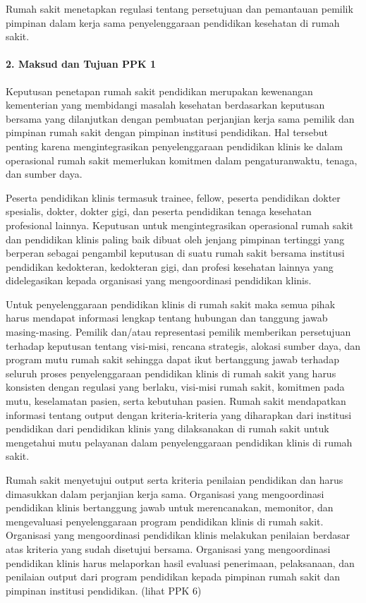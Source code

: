 \documentclass[
]{book}
\begin{document}
Rumah sakit menetapkan regulasi tentang persetujuan dan pemantauan pemilik pimpinan dalam kerja sama penyelenggaraan pendidikan kesehatan di rumah sakit.

\hypertarget{maksud-dan-tujuan-ppk-1}{%
\paragraph*{2. Maksud dan Tujuan PPK 1}\label{maksud-dan-tujuan-ppk-1}}

Keputusan penetapan rumah sakit pendidikan merupakan kewenangan kementerian yang membidangi masalah kesehatan berdasarkan keputusan bersama yang dilanjutkan dengan pembuatan perjanjian kerja sama pemilik dan pimpinan rumah sakit dengan pimpinan institusi pendidikan. Hal tersebut penting karena mengintegrasikan penyelenggaraan pendidikan klinis ke dalam operasional rumah sakit memerlukan komitmen dalam pengaturanwaktu, tenaga, dan sumber daya.

Peserta pendidikan klinis termasuk trainee, fellow, peserta pendidikan dokter spesialis, dokter, dokter gigi, dan peserta pendidikan tenaga kesehatan profesional lainnya. Keputusan untuk mengintegrasikan operasional rumah sakit dan pendidikan klinis paling baik dibuat oleh jenjang pimpinan tertinggi yang berperan sebagai pengambil keputusan di suatu rumah sakit bersama institusi pendidikan kedokteran, kedokteran gigi, dan profesi kesehatan lainnya yang didelegasikan kepada organisasi yang mengoordinasi pendidikan klinis.

Untuk penyelenggaraan pendidikan klinis di rumah sakit maka semua pihak harus mendapat informasi lengkap tentang hubungan dan tanggung jawab masing-masing. Pemilik dan/atau representasi pemilik memberikan persetujuan terhadap keputusan tentang visi-misi, rencana strategis, alokasi sumber daya, dan program mutu rumah sakit sehingga dapat ikut bertanggung jawab terhadap seluruh proses penyelenggaraan pendidikan klinis di rumah sakit yang harus konsisten dengan regulasi yang berlaku, visi-misi rumah sakit, komitmen pada mutu, keselamatan pasien, serta kebutuhan pasien. Rumah sakit mendapatkan informasi tentang output dengan kriteria-kriteria yang diharapkan dari institusi pendidikan dari pendidikan klinis yang dilaksanakan di rumah sakit untuk mengetahui mutu pelayanan dalam penyelenggaraan pendidikan klinis di rumah sakit.

Rumah sakit menyetujui output serta kriteria penilaian pendidikan dan harus dimasukkan dalam perjanjian kerja sama. Organisasi yang mengoordinasi pendidikan klinis bertanggung jawab untuk merencanakan, memonitor, dan mengevaluasi penyelenggaraan program pendidikan klinis di rumah sakit. Organisasi yang mengoordinasi pendidikan klinis melakukan penilaian berdasar atas kriteria yang sudah disetujui bersama. Organisasi yang mengoordinasi pendidikan klinis harus melaporkan hasil evaluasi penerimaan, pelaksanaan, dan penilaian output dari program pendidikan kepada pimpinan rumah sakit dan pimpinan institusi pendidikan. (lihat PPK 6)
\end{document}
